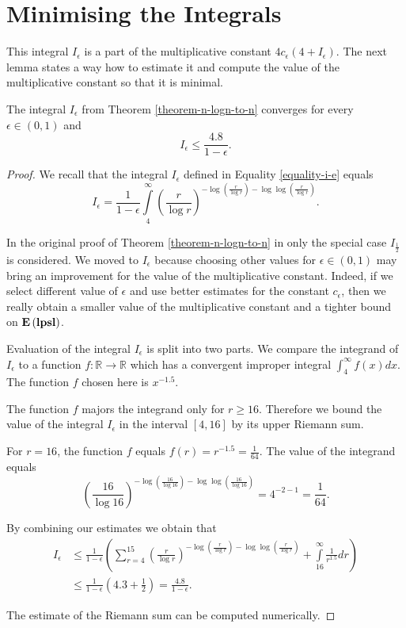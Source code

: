 \section{Minimising the Integrals}
This integral $I_\epsilon$ is a part of the multiplicative constant $4c_\epsilon(4 + I_\epsilon)$. The next lemma states a way how to estimate it and compute the value of the multiplicative constant so that it is minimal.

\label{section-integral-estimate}
\begin{lemma}
\label{lemma-convergent-I-e}
The integral $I_\epsilon$ from Theorem \ref{theorem-n-logn-to-n} converges for every $\epsilon \in (0, 1)$ and
\[
I_\epsilon \leq \frac{4.8}{1 - \epsilon} \text{.}
\]
\end{lemma}
\begin{proof}
We recall that the integral $I_\epsilon$ defined in Equality \ref{equality-i-e} equals
\[
I_{\epsilon} = \frac{1}{1 - \epsilon} \displaystyle\int\limits_4^\infty \left(\frac{r}{\log r}\right)^{-\log \left(\frac{r}{\log r}\right) - \log \log \left(\frac{r}{\log r}\right)} \text{.}
\]

In the original proof of Theorem \ref{theorem-n-logn-to-n} in \cite{DBLP:journals/jacm/AlonDMPT99} only the special case $I_{\frac{1}{2}}$ is considered. We moved to $I_\epsilon$ because choosing other values for $\epsilon \in (0, 1)$ may bring an improvement for the value of the multiplicative constant. Indeed, if we select different value of $\epsilon$ and use better estimates for the constant $c_\epsilon$, then we really obtain a smaller value of the multiplicative constant and a tighter bound on $\mathbf{E}\left(\mathbf{lpsl}\right)$.

Evaluation of the integral $I_\epsilon$ is split into two parts. We compare the integrand of $I_\epsilon$ to a function $f: \mathbb{R} \rightarrow \mathbb{R}$ which has a convergent improper integral $\int_{4}^{\infty} f(x) dx$. The function $f$ chosen here is $x ^ {-1.5}$. 

The function $f$ majors the integrand only for $r \geq 16$. Therefore we bound the value of the integral $I_\epsilon$ in the interval $[4, 16]$ by its upper Riemann sum.

For $r = 16$, the function $f$ equals $f(r) = r ^ {-1.5} = \frac{1}{64}$.
The value of the integrand equals
\[
	\left(\frac{16}{\log 16}\right)^{-\log \left(\frac{16}{\log 16}\right) - \log \log \left(\frac{16}{\log 16}\right)} = 4^{-2 - 1} = \frac{1}{64} \text{.}
\]

By combining our estimates we obtain that
\[
\begin{split}
I_{\epsilon} 
	& \leq \frac{1}{1 - \epsilon} \left( \displaystyle \sum_{r = 4}^{15} \left(\frac{r}{\log r}\right)^{-\log \left(\frac{r}{\log r}\right) - \log \log \left(\frac{r}{\log r}\right)} + \int\limits_{16}^\infty \frac{1}{r^{1.5}} dr \right) \\
	& \leq \frac{1}{1 - \epsilon} \left(4.3 + \frac{1}{2}\right) = \frac{4.8}{1-\epsilon} \text{.}
\end{split}
\]

The estimate of the Riemann sum can be computed numerically.
\end{proof}

